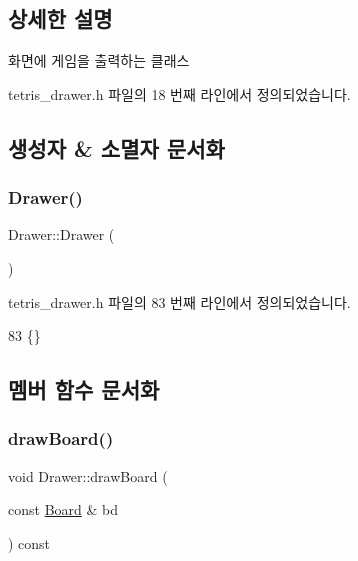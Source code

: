 \subsection{상세한 설명}
화면에 게임을 출력하는 클래스 

tetris\+\_\+drawer.\+h 파일의 18 번째 라인에서 정의되었습니다.



\subsection{생성자 \& 소멸자 문서화}
\mbox{\label{class_drawer_a7daabfaadc8a076a71f5f09b0a88f4bb}} 
\subsubsection{\texorpdfstring{Drawer()}{Drawer()}}
{\footnotesize\ttfamily Drawer\+::\+Drawer (\begin{DoxyParamCaption}{ }\end{DoxyParamCaption})\hspace{0.3cm}{\ttfamily [inline]}}



tetris\+\_\+drawer.\+h 파일의 83 번째 라인에서 정의되었습니다.


\begin{DoxyCode}
83 \{\}
\end{DoxyCode}


\subsection{멤버 함수 문서화}
\mbox{\label{class_drawer_af26df40487cb2de033887b5342d94b5a}} 
\subsubsection{\texorpdfstring{draw\+Board()}{drawBoard()}}
{\footnotesize\ttfamily void Drawer\+::draw\+Board (\begin{DoxyParamCaption}\item[{const \mbox{\hyperlink{class_board}{Board}} \&}]{bd }\end{DoxyParamCaption}) const\hspace{0.3cm}{\ttfamily [inline]}}



